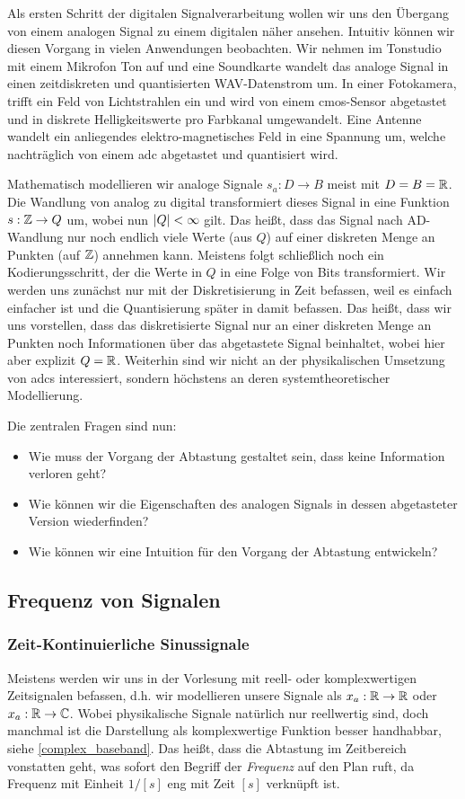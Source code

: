 %
Als ersten Schritt der digitalen Signalverarbeitung wollen wir uns den Übergang von einem analogen Signal zu einem digitalen näher ansehen.
Intuitiv können wir diesen Vorgang in vielen Anwendungen beobachten.
Wir nehmen im Tonstudio mit einem Mikrofon Ton auf und eine Soundkarte wandelt das analoge Signal in einen zeitdiskreten und quantisierten WAV-Datenstrom um.
In einer Fotokamera, trifft ein Feld von Lichtstrahlen ein und wird von einem \gls{cmos}-Sensor  abgetastet und in diskrete Helligkeitswerte pro Farbkanal umgewandelt.
Eine Antenne wandelt ein anliegendes elektro-magnetisches Feld in eine Spannung um, welche nachträglich von einem \gls{adc} abgetastet und quantisiert wird.

Mathematisch modellieren wir analoge Signale $s_a : D \rightarrow B$ meist mit $D = B = \mathbb{R}$.
Die Wandlung von analog zu digital transformiert dieses Signal in eine Funktion $s: \mathbb{Z} \rightarrow Q$ um, wobei nun ${\left| Q \right|} < \infty$ gilt.
Das heißt, dass das Signal nach AD-Wandlung nur noch endlich viele Werte (aus $Q$) auf einer diskreten Menge an Punkten (auf $\mathbb{Z}$) annehmen kann.
Meistens folgt schließlich noch ein Kodierungsschritt, der die Werte in $Q$ in eine Folge von Bits transformiert.
Wir werden uns zunächst nur mit der Diskretisierung in Zeit befassen, weil es einfach einfacher ist und die Quantisierung später in  damit befassen.
Das heißt, dass wir uns vorstellen, dass das diskretisierte Signal nur an einer diskreten Menge an Punkten noch Informationen über das abgetastete Signal beinhaltet, wobei hier aber explizit $Q = \mathbb{R}$.
Weiterhin sind wir nicht an der physikalischen Umsetzung von \glspl{adc} interessiert, sondern höchstens an deren systemtheoretischer Modellierung.

Die zentralen Fragen sind nun:
\begin{itemize}
    \item Wie muss der Vorgang der Abtastung gestaltet sein, dass keine Information verloren geht?
    \item Wie können wir die Eigenschaften des analogen Signals in dessen abgetasteter Version wiederfinden?
    \item Wie können wir eine Intuition für den Vorgang der Abtastung entwickeln?
\end{itemize}
%
\subsection{Frequenz von Signalen}
%
\subsubsection{Zeit-Kontinuierliche Sinussignale}
%
Meistens werden wir uns in der Vorlesung mit reell- oder komplexwertigen Zeitsignalen befassen, d.h. wir modellieren unsere Signale als $x_a : \mathbb{R} \rightarrow \mathbb{R}$ oder $x_a: \mathbb{R} \rightarrow \mathbb{C}$.
Wobei physikalische Signale natürlich nur reellwertig sind, doch manchmal ist die Darstellung als komplexwertige Funktion besser handhabbar, siehe \eqref{complex_baseband}.
Das heißt, dass die Abtastung im Zeitbereich vonstatten geht, was sofort den Begriff der \emph{Frequenz} auf den Plan ruft, da Frequenz mit Einheit $1/[s]$ eng mit Zeit $[s]$ verknüpft ist.

